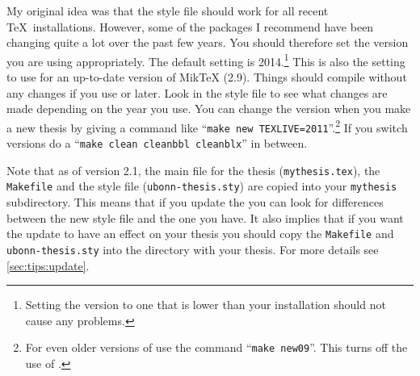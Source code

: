 My original idea was that the style file should work for all recent
\TeX\ installations.  However, some of the packages I recommend have
been changing quite a lot over the past few years. 
You should therefore set the \TeXLive version you are using appropriately.
The default setting is 2014.\footnote{%
Setting the \TeXLive version to one that is lower than your installation should not cause any problems.}
This is also the setting to use for an up-to-date version of MikTeX (2.9).
Things should compile without any changes if you use  or later.
Look in the style file to see what changes are made depending on the year you use.
You can change the \TeXLive version when you make a new thesis 
by giving a command like \enquote{\texttt{make new TEXLIVE=2011}}.\footnote{%
For even older versions of \TeXLive use the command \enquote{\texttt{make new09}}.
This turns off the use of .}
If you switch \TeXLive versions do a
\enquote{\texttt{make clean cleanbbl cleanblx}} in between.

Note that as of version 2.1, the main file for the thesis
(\texttt{mythesis.tex}), the \texttt{Makefile} and the style file
(\texttt{ubonn-thesis.sty}) are copied into your \texttt{mythesis}
subdirectory. This means that if you update the 
you can look for differences between the new style file and the one
you have. It also implies that if you want the update to have an
effect on your thesis you should copy the \texttt{Makefile} and
\texttt{ubonn-thesis.sty} into the directory with your thesis.
For more details see \cref{sec:tips:update}.

